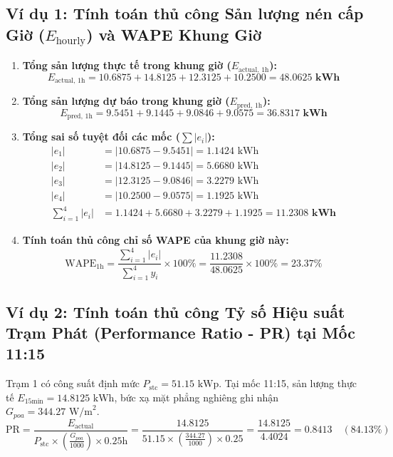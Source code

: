 \documentclass[12pt,a4paper]{article}
\begin{document}
\subsection{Ví dụ 1: Tính toán thủ công Sản lượng nén cấp Giờ ($E_{\text{hourly}}$) và WAPE Khung Giờ}
\begin{enumerate}
    \item \textbf{Tổng sản lượng thực tế trong khung giờ ($E_{\text{actual, 1h}}$):}
    \begin{equation}
        E_{\text{actual, 1h}} = 10.6875 + 14.8125 + 12.3125 + 10.2500 = \mathbf{48.0625 \text{ kWh}}
    \end{equation}

    \item \textbf{Tổng sản lượng dự báo trong khung giờ ($E_{\text{pred, 1h}}$):}
    \begin{equation}
        E_{\text{pred, 1h}} = 9.5451 + 9.1445 + 9.0846 + 9.0575 = \mathbf{36.8317 \text{ kWh}}
    \end{equation}

    \item \textbf{Tổng sai số tuyệt đối các mốc ($\sum |e_i|$):}
    \begin{align}
        |e_1| &= |10.6875 - 9.5451| = 1.1424 \text{ kWh} \\
        |e_2| &= |14.8125 - 9.1445| = 5.6680 \text{ kWh} \\
        |e_3| &= |12.3125 - 9.0846| = 3.2279 \text{ kWh} \\
        |e_4| &= |10.2500 - 9.0575| = 1.1925 \text{ kWh} \\
        \sum_{i=1}^{4} |e_i| &= 1.1424 + 5.6680 + 3.2279 + 1.1925 = \mathbf{11.2308 \text{ kWh}}
    \end{align}

    \item \textbf{Tính toán thủ công chỉ số WAPE của khung giờ này:}
    \begin{equation}
        \text{WAPE}_{\text{1h}} = \frac{\sum_{i=1}^{4} |e_i|}{\sum_{i=1}^{4} y_i} \times 100\% = \frac{11.2308}{48.0625} \times 100\% = \mathbf{23.37\%}
    \end{equation}
\end{enumerate}

\subsection{Ví dụ 2: Tính toán thủ công Tỷ số Hiệu suất Trạm Phát (Performance Ratio - PR) tại Mốc 11:15}
Trạm 1 có công suất định mức $P_{\text{stc}} = 51.15 \text{ kWp}$. Tại mốc 11:15, sản lượng thực tế $E_{\text{15min}} = 14.8125 \text{ kWh}$, bức xạ mặt phẳng nghiêng ghi nhận $G_{poa} = 344.27 \text{ W/m}^2$.
\begin{equation}
    \text{PR} = \frac{E_{\text{actual}}}{P_{\text{stc}} \times \left(\frac{G_{poa}}{1000}\right) \times 0.25 \text{h}} = \frac{14.8125}{51.15 \times \left(\frac{344.27}{1000}\right) \times 0.25} = \frac{14.8125}{4.4024} = \mathbf{0.8413} \quad (\mathbf{84.13\%})
\end{equation}
\end{document}
